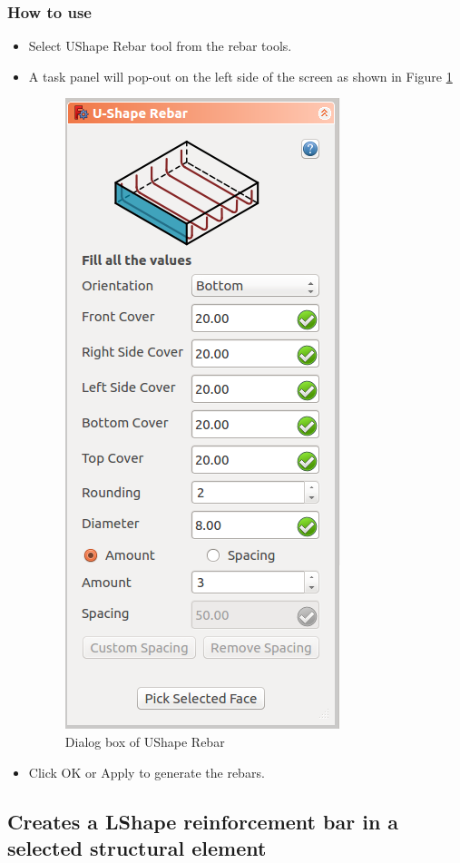 \subsubsection{How to use}
\begin{itemize}
\item Select UShape Rebar tool from the rebar tools.
\item A task panel will pop-out on the left side of the screen as shown in Figure \ref{ushaperebardialog}
\begin{figure}
    \centering \includegraphics[scale=0.60]{images/UShapeDialog.png}
    \caption{Dialog box of UShape Rebar}
    \label{ushaperebardialog}
\end{figure}
\item Click OK or Apply to generate the rebars.
\end{itemize}

\subsection{Creates a LShape reinforcement bar in a selected structural element}
